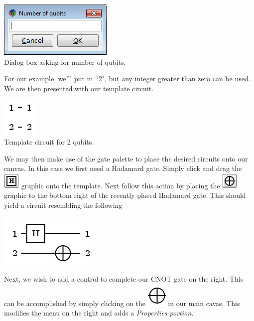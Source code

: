 \documentclass[10pt]{article}
\theoremstyle{definition}
\begin{document}
\begin{center}
\includegraphics{Figures/CreateCircuit/NumberOfQubits.png}\\
Dialog box asking for number of qubits.
\end{center}

For our example, we'll put in ``2", but any integer greater than zero can be used. We are then presented with our template circuit.

\begin{center}
\includegraphics[scale=.7]{Figures/CreateCircuit/TemplateCircuit}\\
Template circuit for 2 qubits.
\end{center}

We may then make use of the gate palette to place the desired circuits onto our canvas. In this case we first need a Hadamard gate. Simply click and drag the \includegraphics{Figures/Gates/Hadamard.png} graphic onto the template. Next follow this action by placing the \includegraphics{Figures/Gates/Mod2.png} graphic to the bottom right of the recently placed Hadamard gate. This should yield a circuit resembling the following

\begin{center}
\includegraphics[scale=.7]{Figures/CreateCircuit/EPRCircuit2}
\end{center}

Next, we wish to add a control to complete our CNOT gate on the right. This can be accomplished by simply clicking on the \includegraphics[scale=0.60]{Figures/CreateCircuit/CNOT.png} in our main cavas. This modifies the menu on the right and adds a \em Properties \em portion. 
\end{document}
